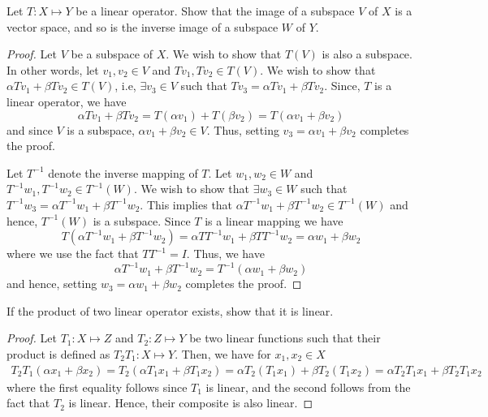  \begin{question}
     Let $T : X \mapsto Y$ be a linear operator. Show that the image of a subspace $V$ of $X$ is a vector space, and so is the inverse image of a subspace $W$ of $Y$.
     \label{section2.6-5}
  \end{question}
  \begin{proof}
      Let $V$ be a subspace of $X$. We wish to show that $T(V)$ is also a subspace. In other words, let $v_1 , v_2 \in V$ and $Tv_1, Tv_2 \in T(V)$. We wish to show that $\alpha Tv_1 + \beta Tv_2 \in T(V)$, i.e, $\exists v_3 \in V $ such that $Tv_3 = \alpha Tv_1 + \beta Tv_2$. Since, $T$ is a linear operator, we have
      \[\alpha Tv_1 + \beta Tv_2 = T(\alpha v_1) + T(\beta v_2) = T(\alpha v_1 + \beta v_2) \]
      and since $V$ is a subspace, $\alpha v_1 + \beta v_2 \in V$. Thus, setting $v_3 = \alpha v_1 + \beta v_2$ completes the proof.

      Let $T^{-1}$ denote the inverse mapping of $T$. Let $w_1 , w_2 \in W$ and $T^{-1}w_1 , T^{-1}w_2 \in T^{-1}(W)$. We wish to show that $\exists w_3 \in W$ such that $T^{-1}w_3 = \alpha T^{-1}w_1 + \beta T^{-1}w_2$. This implies that $\alpha T^{-1}w_1 + \beta T^{-1}w_2 \in T^{-1}(W)$ and hence, $T^{-1}(W)$ is a subspace. Since $T$ is a linear mapping we have
      \[T(\alpha T^{-1}w_1 + \beta T^{-1}w_2) = \alpha TT^{-1}w_1 + \beta TT^{-1}w_2 = \alpha w_1 + \beta w_2\]
      where we use the fact that $TT^{-1} = I$. Thus, we have
      \[\alpha T^{-1}w_1 + \beta T^{-1}w_2 = T^{-1}(\alpha w_1 + \beta w_2)\]
      and hence, setting $w_3 = \alpha w_1 + \beta w_2$ completes the proof.
  \end{proof}

  \begin{question}
      If the product of two linear operator exists, show that it is linear.
      \label{section2.6-6}
  \end{question}
  \begin{proof}
      Let $T_1 : X \mapsto Z$ and $T_2 : Z \mapsto Y$ be two linear functions such that their product is defined as $T_2 T_1 : X \mapsto Y$. Then, we have for $x_1 , x_2 \in X$
      \begin{align*}
          T_2 T_1(\alpha x_1 + \beta x_2) = T_2 (\alpha T_1 x_1+ \beta T_1 x_2) = \alpha T_2(T_1 x_1) + \beta T_2(T_1 x_2) = \alpha T_2 T_1 x_1 + \beta T_2 T_1 x_2
      \end{align*}
      where the first equality follows since $T_1$ is linear, and the second follows from the fact that $T_2$ is linear. Hence, their composite is also linear.
  \end{proof}

